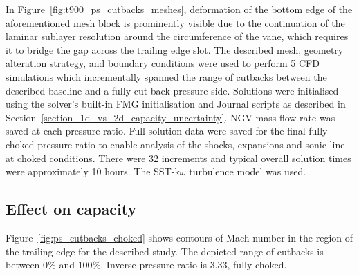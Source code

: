 \documentclass[a4paper, 11pt, oneside]{report}
\begin{document}
In Figure~\ref{fig:t900_ps_cutbacks_meshes}, deformation of the bottom edge of the aforementioned mesh block is prominently visible due to the continuation of the laminar sublayer resolution around the circumference of the vane, which requires it to bridge the gap across the trailing edge slot. The described mesh, geometry alteration strategy, and boundary conditions were used to perform 5 CFD simulations which incrementally spanned the range of cutbacks between the described baseline and a fully cut back pressure side. Solutions were initialised using the solver's built-in FMG initialisation and Journal scripts as described in Section~\ref{section_1d_vs_2d_capacity_uncertainty}. NGV mass flow rate was saved at each pressure ratio. Full solution data were saved for the final fully choked pressure ratio to enable analysis of the shocks, expansions and sonic line at choked conditions. There were 32 increments and typical overall solution times were approximately 10 hours. The SST-k$\omega$ turbulence model was used.

\subsection{Effect on capacity}

Figure~\ref{fig:ps_cutbacks_choked} shows contours of Mach number in the region of the trailing edge for the described study. The depicted range of cutbacks is between $0\%$ and $100\%$. Inverse pressure ratio is $3.33$, fully choked.
\end{document}
